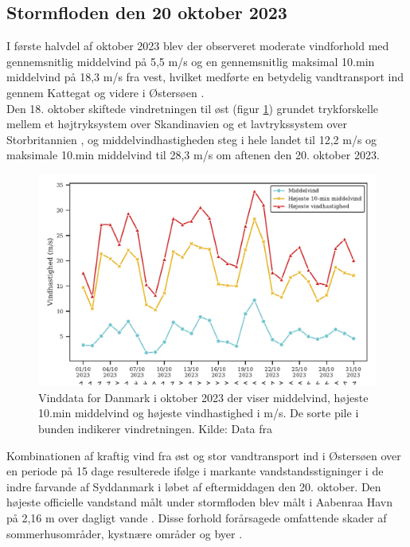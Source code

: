 \subsection{Stormfloden den 20 oktober 2023} \label{Afsnit: Stormfloden den 20 oktober 2023}
I første halvdel af oktober 2023 blev der observeret moderate vindforhold med gennemsnitlig middelvind på 5,5 m/s og en gennemsnitlig maksimal 10.min middelvind på 18,3 m/s fra vest, hvilket medførte en betydelig vandtransport ind gennem Kattegat og videre i Østersøen \citep{dmi_vejrarkiv}. \\
Den 18. oktober skiftede vindretningen til øst (figur \ref{Figur: Vinddata Danmark}) grundet trykforskelle mellem et højtryksystem over Skandinavien og et lavtrykssystem over Storbritannien \citep{kiesel_brief_2024}, og middelvindhastigheden steg i hele landet til 12,2 m/s og maksimale 10.min middelvind til 28,3 m/s om aftenen den 20. oktober 2023. 
\begin{figure} [H]
    \centering
    \includegraphics[width=0.8\linewidth]{images/teori/vinddata_grafer/Danmark_vinddata.pdf}
    \caption{Vinddata for Danmark i oktober 2023 der viser middelvind, højeste 10.min middelvind og højeste vindhastighed i m/s. De sorte pile i bunden indikerer vindretningen. Kilde: Data fra \cite{dmi_vejrarkiv} }
    \label{Figur: Vinddata Danmark}
\end{figure}

Kombinationen af kraftig vind fra øst og stor vandtransport ind i Østersøen over en periode på 15 dage resulterede ifølge \cite{kystdirektoratet_stormflod2023} i markante vandstandsstigninger i de indre farvande af Syddanmark i løbet af eftermiddagen den 20. oktober. Den højeste officielle vandstand målt under stormfloden blev målt i Aabenraa Havn på 2,16 m over dagligt vande \citep{damberg_vaerste_2023}. Disse forhold forårsagede omfattende skader af sommerhusområder, kystnære områder og byer \citep{kystdirektoratet_stormflod2023, naturskaderadet_anmeldelser_2023}. 




